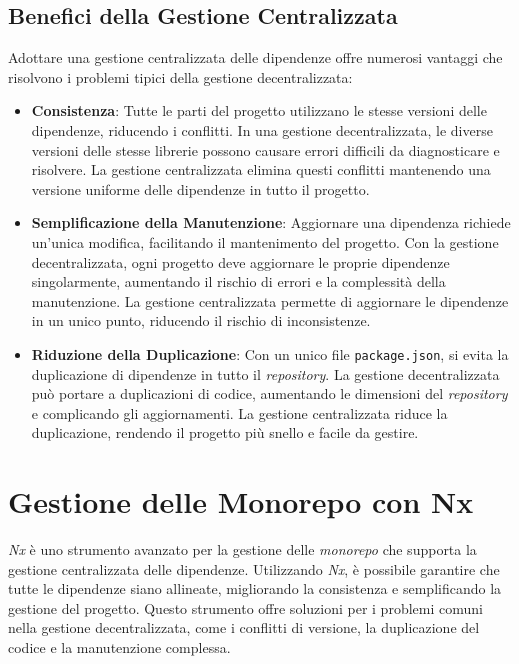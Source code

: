 \subsection{Benefici della Gestione Centralizzata}
Adottare una gestione centralizzata delle dipendenze offre numerosi vantaggi che risolvono i problemi tipici della gestione decentralizzata:

\begin{itemize}
    \item \textbf{Consistenza}: Tutte le parti del progetto utilizzano le stesse versioni delle dipendenze, riducendo i conflitti.
    In una gestione decentralizzata, le diverse versioni delle stesse librerie possono causare errori difficili da diagnosticare e risolvere.
    La gestione centralizzata elimina questi conflitti mantenendo una versione uniforme delle dipendenze in tutto il progetto.
    \item \textbf{Semplificazione della Manutenzione}: Aggiornare una dipendenza richiede un'unica modifica, facilitando il mantenimento del progetto.
    Con la gestione decentralizzata, ogni progetto deve aggiornare le proprie dipendenze singolarmente, aumentando il rischio di errori e la complessità della manutenzione.
    La gestione centralizzata permette di aggiornare le dipendenze in un unico punto, riducendo il rischio di inconsistenze.
    \item \textbf{Riduzione della Duplicazione}: Con un unico file \texttt{package.json}, si evita la duplicazione di dipendenze in tutto il \textit{repository}.
    La gestione decentralizzata può portare a duplicazioni di codice, aumentando le dimensioni del \textit{repository} e complicando gli aggiornamenti.
    La gestione centralizzata riduce la duplicazione, rendendo il progetto più snello e facile da gestire.
\end{itemize}

\section{Gestione delle Monorepo con Nx}
\textit{Nx} è uno strumento avanzato per la gestione delle \textit{monorepo} che supporta la gestione centralizzata delle dipendenze.
Utilizzando \textit{Nx}, è possibile garantire che tutte le dipendenze siano allineate, migliorando la consistenza e semplificando la gestione del progetto.
Questo strumento offre soluzioni per i problemi comuni nella gestione decentralizzata, come i conflitti di versione, la duplicazione del codice e la manutenzione complessa.

